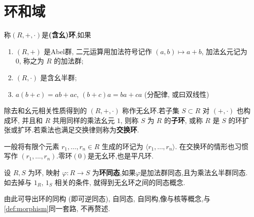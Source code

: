 \section{环和域}
\begin{definition}
	称$(R, +, \cdot)$是\textbf{(含幺)环},如果
	\begin{enumerate}
		\item $(R, +)$ 是Abel群, 二元运算用加法符号记作 $(a,b) \mapsto a+b$, 加法幺元记为 $0$, 称之为 $R$ 的加法群;
		\item $(R, \cdot)$ 是含幺半群;
		\item $a(b+c) = ab+ac$, $(b+c)a = ba + ca$ \quad (分配律, 或曰双线性)
	\end{enumerate}

	除去和幺元相关性质得到的 $(R, +, \cdot)$ 称作无幺环.若子集 $S \subset R$ 对 $(+, \cdot)$ 也构成环, 并且和 $R$ 共用同样的乘法幺元 $1$, 则称 $S$ 为 $R$ 的\textbf{子环}, 或称 $R$ 是 $S$ 的环扩张或扩环.若乘法也满足交换律则称为\textbf{交换环}.
\end{definition}
\begin{example}
	一般将有限个元素 $r_1, \ldots, r_n \in R$ 生成的环记为 $\langle r_1, \ldots, r_n\rangle$. 在交换环的情形也习惯写作 $(r_1, \ldots, r_n)$.零环$(0)$是无幺环,也是平凡环.
\end{example}
\begin{definition}
	设 $R, S$ 为环, 映射 $\varphi: R \to S$ 为\textbf{环同态},如果$\varphi$是加法群同态,且为乘法幺半群同态.如去掉与 $1_R$, $1_S$ 相关的条件, 就得到无幺环之间的同态概念.
\end{definition}

由此可导出环的同构 (即可逆同态), 自同态, 自同构,像与核等概念,与\ref{def:morphism}同一套路, 不再赘述.

